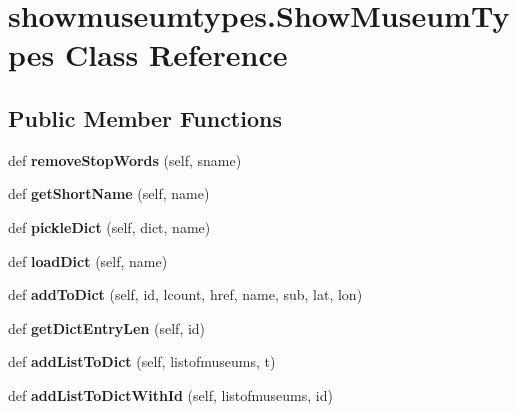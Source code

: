 \hypertarget{classshowmuseumtypes_1_1ShowMuseumTypes}{}\section{showmuseumtypes.\+Show\+Museum\+Types Class Reference}
\label{classshowmuseumtypes_1_1ShowMuseumTypes}
\subsection*{Public Member Functions}
\begin{DoxyCompactItemize}
\item 
\mbox{\label{classshowmuseumtypes_1_1ShowMuseumTypes_a432309b10390048c5818cd8388190de3}} 
def {\bfseries remove\+Stop\+Words} (self, sname)
\item 
\mbox{\label{classshowmuseumtypes_1_1ShowMuseumTypes_a98e397d0575ab8a3ba8a8bbba8bacc32}} 
def {\bfseries get\+Short\+Name} (self, name)
\item 
\mbox{\label{classshowmuseumtypes_1_1ShowMuseumTypes_a7d1e404b4f80f3c81b2063389b180f4f}} 
def {\bfseries pickle\+Dict} (self, dict, name)
\item 
\mbox{\label{classshowmuseumtypes_1_1ShowMuseumTypes_a0fb81d8ad9c7910ac627f90b687c7057}} 
def {\bfseries load\+Dict} (self, name)
\item 
\mbox{\label{classshowmuseumtypes_1_1ShowMuseumTypes_a1978ca511292d1fb4dd116e71125dfe7}} 
def {\bfseries add\+To\+Dict} (self, id, lcount, href, name, sub, lat, lon)
\item 
\mbox{\label{classshowmuseumtypes_1_1ShowMuseumTypes_ad34221207f0e84f71d0cc4286046febd}} 
def {\bfseries get\+Dict\+Entry\+Len} (self, id)
\item 
\mbox{\label{classshowmuseumtypes_1_1ShowMuseumTypes_af514d0b20490559f26b36113af668357}} 
def {\bfseries add\+List\+To\+Dict} (self, listofmuseums, t)
\item 
\mbox{\label{classshowmuseumtypes_1_1ShowMuseumTypes_ac35c1fdac7b4e0fb65f4880c345df67a}} 
def {\bfseries add\+List\+To\+Dict\+With\+Id} (self, listofmuseums, id)
\end{DoxyCompactItemize}
